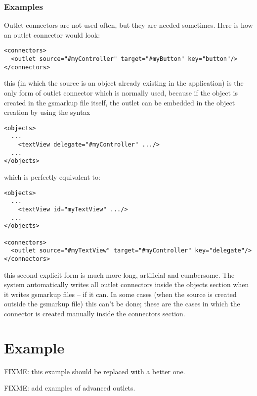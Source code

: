 \subsubsection{Examples}
Outlet connectors are not used often, but they are needed sometimes.
Here is how an outlet connector would look:
\begin{verbatim}
<connectors>
  <outlet source="#myController" target="#myButton" key="button"/>
</connectors>
\end{verbatim}
this (in which the source is an object already existing in the
application) is the only form of outlet connector which is normally
used, because if the object is created in the gsmarkup file itself, the outlet
can be embedded in the object creation by using the syntax
\begin{verbatim}
<objects>
  ...
    <textView delegate="#myController" .../>
  ...
</objects>
\end{verbatim}
which is perfectly equivalent to:
\begin{verbatim}
<objects>
  ...
    <textView id="myTextView" .../>
  ...
</objects>

<connectors>
  <outlet source="#myTextView" target="#myController" key="delegate"/>
</connectors>
\end{verbatim}
this second explicit form is much more long, artificial and
cumbersome.  The system automatically writes all outlet connectors
inside the objects section when it writes gsmarkup files -- if it can.  In
some cases (when the source is created outside the gsmarkup file) this
can't be done; these are the cases in which the connector is created
manually inside the connectors section.

\section{Example}

FIXME: this example should be replaced with a better one.

FIXME: add examples of advanced outlets.

